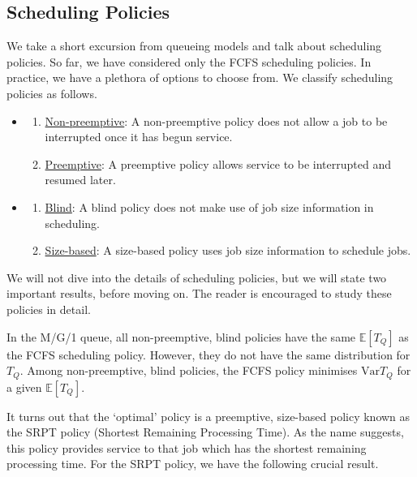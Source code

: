 \documentclass[12pt]{article}
\def\E{\mathbb{E}}
\def\Var{\text{Var}}
\theoremstyle{definition}
\begin{document}
\subsection{Scheduling Policies}

We take a short excursion from queueing models and talk about scheduling policies. So far, we have considered only the FCFS scheduling policies. In practice, we have a plethora of options to choose from. We classify scheduling policies as follows.

\begin{itemize}
    \item \begin{enumerate}
        \item \underline{Non-preemptive}: A non-preemptive policy does not allow a job to be interrupted once it has begun service.
        \item \underline{Preemptive}: A preemptive policy allows service to be interrupted and resumed later.
    \end{enumerate}
    
    \item \begin{enumerate}
        \item \underline{Blind}: A blind policy does not make use of job size information in scheduling.
        \item \underline{Size-based}: A size-based policy uses job size information to schedule jobs.
    \end{enumerate}
\end{itemize}

We will not dive into the details of scheduling policies, but we will state two important results, before moving on. The reader is encouraged to study these policies in detail.

\begin{thm}
    In the M/G/1 queue, all non-preemptive, blind policies have the same $\E[T_Q]$ as the FCFS scheduling policy. However, they do not have the same distribution for $T_Q$. Among non-preemptive, blind policies, the FCFS policy minimises $\Var{T_Q}$ for a given $\E[T_Q]$. 
\end{thm}

It turns out that the `optimal' policy is a preemptive, size-based policy known as the SRPT policy (Shortest Remaining Processing Time). As the name suggests, this policy provides service to that job which has the shortest remaining processing time. For the SRPT policy, we have the following crucial result.
\end{document}
